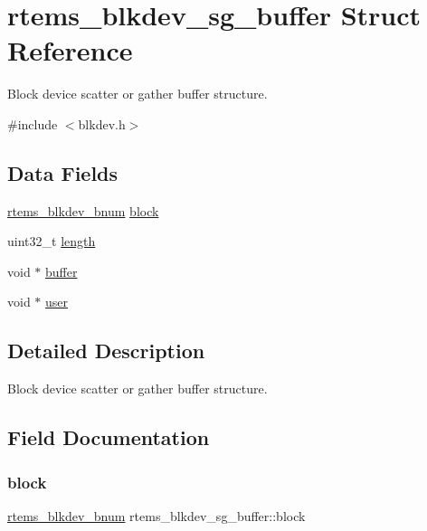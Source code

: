 \hypertarget{structrtems__blkdev__sg__buffer}{}\section{rtems\+\_\+blkdev\+\_\+sg\+\_\+buffer Struct Reference}
\label{structrtems__blkdev__sg__buffer}


Block device scatter or gather buffer structure.  




{\ttfamily \#include $<$blkdev.\+h$>$}

\subsection*{Data Fields}
\begin{DoxyCompactItemize}
\item 
\mbox{\hyperlink{group__rtems__disk_ga5fbcfd40b657bff6c54d9e393fab3274}{rtems\+\_\+blkdev\+\_\+bnum}} \mbox{\hyperlink{structrtems__blkdev__sg__buffer_a1ed04aa4455603fb87d8000d759b15b3}{block}}
\item 
uint32\+\_\+t \mbox{\hyperlink{structrtems__blkdev__sg__buffer_a8c03b562d75f1af31e765c9df9db2555}{length}}
\item 
void $\ast$ \mbox{\hyperlink{structrtems__blkdev__sg__buffer_a7ade07e731b6633a7788d5c4cec39622}{buffer}}
\item 
void $\ast$ \mbox{\hyperlink{structrtems__blkdev__sg__buffer_ab7fd935b734a4a9d3beb5d7f16937da1}{user}}
\end{DoxyCompactItemize}


\subsection{Detailed Description}
Block device scatter or gather buffer structure. 

\subsection{Field Documentation}
\mbox{\label{structrtems__blkdev__sg__buffer_a1ed04aa4455603fb87d8000d759b15b3}} 
\subsubsection{\texorpdfstring{block}{block}}
{\footnotesize\ttfamily \mbox{\hyperlink{group__rtems__disk_ga5fbcfd40b657bff6c54d9e393fab3274}{rtems\+\_\+blkdev\+\_\+bnum}} rtems\+\_\+blkdev\+\_\+sg\+\_\+buffer\+::block}

